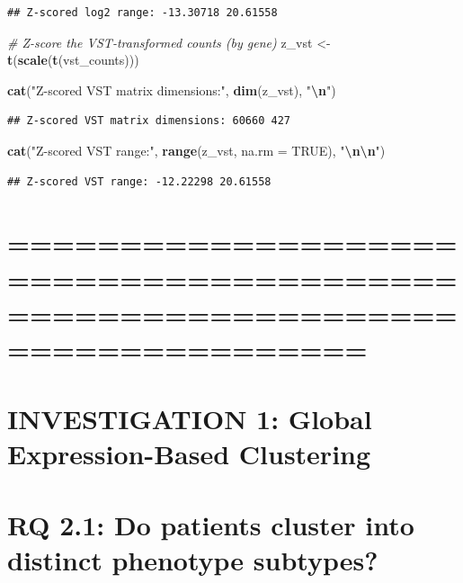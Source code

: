 \documentclass[
]{article}
\newenvironment{Shaded}{\begin{snugshade}}{\end{snugshade}}
\newcommand{\AttributeTok}[1]{\textcolor[rgb]{0.13,0.29,0.53}{#1}}
\newcommand{\CommentTok}[1]{\textcolor[rgb]{0.56,0.35,0.01}{\textit{#1}}}
\newcommand{\ConstantTok}[1]{\textcolor[rgb]{0.56,0.35,0.01}{#1}}
\newcommand{\FunctionTok}[1]{\textcolor[rgb]{0.13,0.29,0.53}{\textbf{#1}}}
\newcommand{\NormalTok}[1]{#1}
\newcommand{\OtherTok}[1]{\textcolor[rgb]{0.56,0.35,0.01}{#1}}
\newcommand{\SpecialCharTok}[1]{\textcolor[rgb]{0.81,0.36,0.00}{\textbf{#1}}}
\newcommand{\StringTok}[1]{\textcolor[rgb]{0.31,0.60,0.02}{#1}}
\begin{document}
\begin{verbatim}
## Z-scored log2 range: -13.30718 20.61558
\end{verbatim}

\begin{Shaded}
\begin{Highlighting}[]
\CommentTok{\# Z{-}score the VST{-}transformed counts (by gene)}
\NormalTok{z\_vst }\OtherTok{\textless{}{-}} \FunctionTok{t}\NormalTok{(}\FunctionTok{scale}\NormalTok{(}\FunctionTok{t}\NormalTok{(vst\_counts)))}

\FunctionTok{cat}\NormalTok{(}\StringTok{"Z{-}scored VST matrix dimensions:"}\NormalTok{, }\FunctionTok{dim}\NormalTok{(z\_vst), }\StringTok{"}\SpecialCharTok{\textbackslash{}n}\StringTok{"}\NormalTok{)}
\end{Highlighting}
\end{Shaded}

\begin{verbatim}
## Z-scored VST matrix dimensions: 60660 427
\end{verbatim}

\begin{Shaded}
\begin{Highlighting}[]
\FunctionTok{cat}\NormalTok{(}\StringTok{"Z{-}scored VST range:"}\NormalTok{, }\FunctionTok{range}\NormalTok{(z\_vst, }\AttributeTok{na.rm =} \ConstantTok{TRUE}\NormalTok{), }\StringTok{"}\SpecialCharTok{\textbackslash{}n\textbackslash{}n}\StringTok{"}\NormalTok{)}
\end{Highlighting}
\end{Shaded}

\begin{verbatim}
## Z-scored VST range: -12.22298 20.61558
\end{verbatim}

\section{============================================================================}\label{section-7}

\section{INVESTIGATION 1: Global Expression-Based
Clustering}\label{investigation-1-global-expression-based-clustering}

\section{RQ 2.1: Do patients cluster into distinct phenotype
subtypes?}\label{rq-2.1-do-patients-cluster-into-distinct-phenotype-subtypes}
\end{document}
